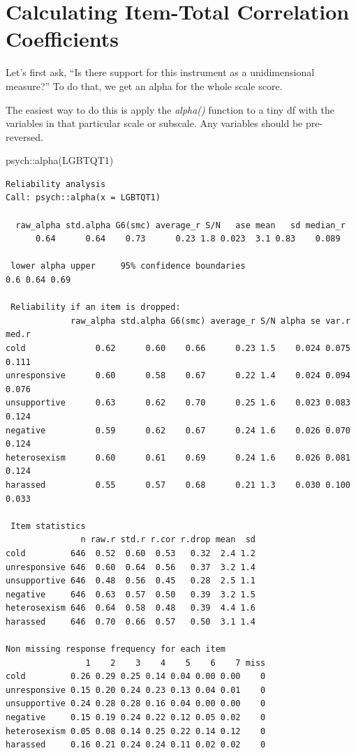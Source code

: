 \documentclass[
  english,
]{book}
\newenvironment{Shaded}{\begin{snugshade}}{\end{snugshade}}
\newcommand{\FunctionTok}[1]{\textcolor[rgb]{0.00,0.00,0.00}{#1}}
\newcommand{\NormalTok}[1]{#1}
\newcommand{\SpecialCharTok}[1]{\textcolor[rgb]{0.00,0.00,0.00}{#1}}
\begin{document}
\hypertarget{calculating-item-total-correlation-coefficients}{%
\section{Calculating Item-Total Correlation Coefficients}\label{calculating-item-total-correlation-coefficients}}

Let's first ask, ``Is there support for this instrument as a unidimensional measure?'' To do that, we get an alpha for the whole scale score.

The easiest way to do this is apply the \emph{alpha()} function to a tiny df with the variables in that particular scale or subscale. Any variables should be pre-reversed.

\begin{Shaded}
\begin{Highlighting}[]
\NormalTok{psych}\SpecialCharTok{::}\FunctionTok{alpha}\NormalTok{(LGBTQT1) }
\end{Highlighting}
\end{Shaded}

\begin{verbatim}
Reliability analysis   
Call: psych::alpha(x = LGBTQT1)

  raw_alpha std.alpha G6(smc) average_r S/N   ase mean   sd median_r
      0.64      0.64    0.73      0.23 1.8 0.023  3.1 0.83    0.089

 lower alpha upper     95% confidence boundaries
0.6 0.64 0.69 

 Reliability if an item is dropped:
             raw_alpha std.alpha G6(smc) average_r S/N alpha se var.r med.r
cold              0.62      0.60    0.66      0.23 1.5    0.024 0.075 0.111
unresponsive      0.60      0.58    0.67      0.22 1.4    0.024 0.094 0.076
unsupportive      0.63      0.62    0.70      0.25 1.6    0.023 0.083 0.124
negative          0.59      0.62    0.67      0.24 1.6    0.026 0.070 0.124
heterosexism      0.60      0.61    0.69      0.24 1.6    0.026 0.081 0.124
harassed          0.55      0.57    0.68      0.21 1.3    0.030 0.100 0.033

 Item statistics 
               n raw.r std.r r.cor r.drop mean  sd
cold         646  0.52  0.60  0.53   0.32  2.4 1.2
unresponsive 646  0.60  0.64  0.56   0.37  3.2 1.4
unsupportive 646  0.48  0.56  0.45   0.28  2.5 1.1
negative     646  0.63  0.57  0.50   0.39  3.2 1.5
heterosexism 646  0.64  0.58  0.48   0.39  4.4 1.6
harassed     646  0.70  0.66  0.57   0.50  3.1 1.4

Non missing response frequency for each item
                1    2    3    4    5    6    7 miss
cold         0.26 0.29 0.25 0.14 0.04 0.00 0.00    0
unresponsive 0.15 0.20 0.24 0.23 0.13 0.04 0.01    0
unsupportive 0.24 0.28 0.28 0.16 0.04 0.00 0.00    0
negative     0.15 0.19 0.24 0.22 0.12 0.05 0.02    0
heterosexism 0.05 0.08 0.14 0.25 0.22 0.14 0.12    0
harassed     0.16 0.21 0.24 0.24 0.11 0.02 0.02    0
\end{verbatim}
\end{document}
